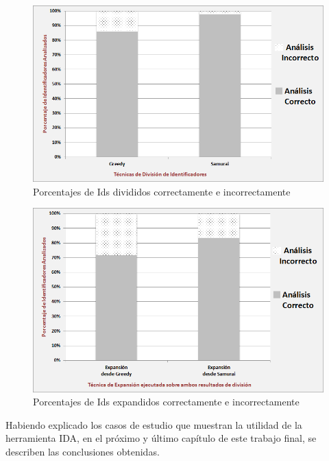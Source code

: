 \enlargethispage{\baselineskip}
\enlargethispage{\baselineskip}

\begin{figure}[h!] %
\centerline{%
\includegraphics[scale= 0.64]{./cap5/barras_01.png}
}
\caption{Porcentajes de Ids divididos correctamente e incorrectamente}
\label{barras01}
\end{figure}
\clearpage


\begin{figure}[h!] %
\centerline{%
\includegraphics[scale= 0.64]{./cap5/barras_02.png}
}
\caption{Porcentajes de Ids expandidos correctamente e incorrectamente}
\label{barras02}
\end{figure}

Habiendo explicado los casos de estudio que muestran la utilidad de la herramienta IDA, en el próximo y último capítulo de este trabajo final, se describen las conclusiones obtenidas.

